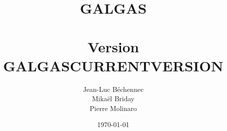 \documentclass [a4paper, 10pt, openany] {book}
\begin{document}
 


\title{\Huge{\textbf{GALGAS}}\\~\\ \normalsize{Version GALGASCURRENTVERSION}}
\author{Jean-Luc Béchennec\\Mikaël Briday\\Pierre Molinaro}
\date \today 

\maketitle


\tableofcontents
 
\end{document}
